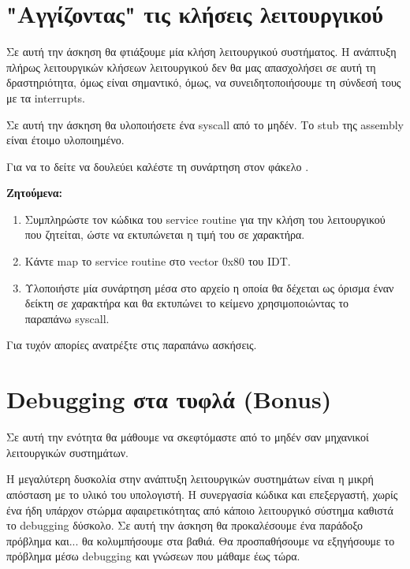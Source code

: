 \documentclass[18pt]{extarticle}
\begin{document}
\section{"Αγγίζοντας" τις κλήσεις λειτουργικού}

Σε αυτή την άσκηση θα φτιάξουμε μία κλήση λειτουργικού συστήματος. Η ανάπτυξη πλήρως λειτουργικών κλήσεων λειτουργικού δεν θα μας απασχολήσει σε αυτή τη δραστηριότητα, όμως
είναι σημαντικό, όμως, να συνειδητοποιήσουμε τη σύνδεσή τους με τα interrupts.

\begin{question}
    Σε αυτή την άσκηση θα υλοποιήσετε ένα syscall από το μηδέν. Το stub της assembly είναι έτοιμο υλοποιημένο.

    Για να το δείτε να δουλεύει καλέστε τη συνάρτηση  στον φάκελο .

    \textbf{Ζητούμενα:}

    \begin{enumerate}
        \item Συμπληρώστε τον κώδικα του service routine για την κλήση του λειτουργικού που ζητείται, ώστε να εκτυπώνεται η τιμή του  σε χαρακτήρα.
        \item Κάντε map το service routine στο vector 0x80 του IDT.
        \item Υλοποιήστε μία συνάρτηση  μέσα στο αρχείο  η οποία θα δέχεται ως όρισμα έναν δείκτη σε χαρακτήρα και θα εκτυπώνει
        το κείμενο χρησιμοποιώντας το \\ παραπάνω syscall.
    \end{enumerate}

    Για τυχόν απορίες ανατρέξτε στις παραπάνω ασκήσεις.
\end{question}

\section{Debugging στα τυφλά (Bonus)}

Σε αυτή την ενότητα θα μάθουμε να σκεφτόμαστε από το μηδέν σαν μηχανικοί λειτουργικών συστημάτων. 

Η μεγαλύτερη δυσκολία στην ανάπτυξη λειτουργικών συστημάτων είναι η μικρή απόσταση με το υλικό του υπολογιστή. Η συνεργασία κώδικα και επεξεργαστή, χωρίς ένα
ήδη υπάρχον στώρμα αφαιρετικότητας από κάποιο λειτουργικό σύστημα καθιστά το debugging δύσκολο. Σε αυτή την άσκηση θα προκαλέσουμε ένα παράδοξο πρόβλημα και...
θα κολυμπήσουμε στα βαθιά. Θα προσπαθήσουμε να εξηγήσουμε το πρόβλημα μέσω debugging και γνώσεων που μάθαμε έως τώρα.
\end{document}
